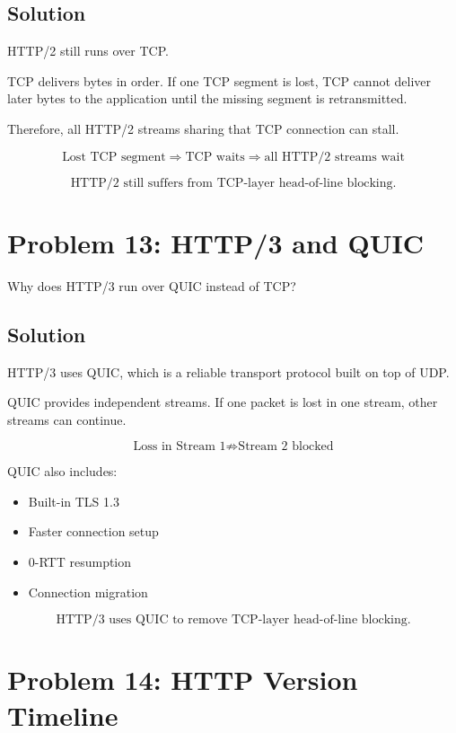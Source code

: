 \documentclass[12pt]{article}
\begin{document}
\subsection*{Solution}

HTTP/2 still runs over TCP.

TCP delivers bytes in order. If one TCP segment is lost, TCP cannot deliver later bytes to the application until the missing segment is retransmitted.

Therefore, all HTTP/2 streams sharing that TCP connection can stall.

\[
\text{Lost TCP segment} \Rightarrow \text{TCP waits} \Rightarrow \text{all HTTP/2 streams wait}
\]

\[
\boxed{\text{HTTP/2 still suffers from TCP-layer head-of-line blocking.}}
\]

\section*{Problem 13: HTTP/3 and QUIC}

Why does HTTP/3 run over QUIC instead of TCP?

\subsection*{Solution}

HTTP/3 uses QUIC, which is a reliable transport protocol built on top of UDP.

QUIC provides independent streams. If one packet is lost in one stream, other streams can continue.

\[
\text{Loss in Stream 1} \not\Rightarrow \text{Stream 2 blocked}
\]

QUIC also includes:

\begin{itemize}
    \item Built-in TLS 1.3
    \item Faster connection setup
    \item 0-RTT resumption
    \item Connection migration
\end{itemize}

\[
\boxed{\text{HTTP/3 uses QUIC to remove TCP-layer head-of-line blocking.}}
\]

\section*{Problem 14: HTTP Version Timeline}
\end{document}
